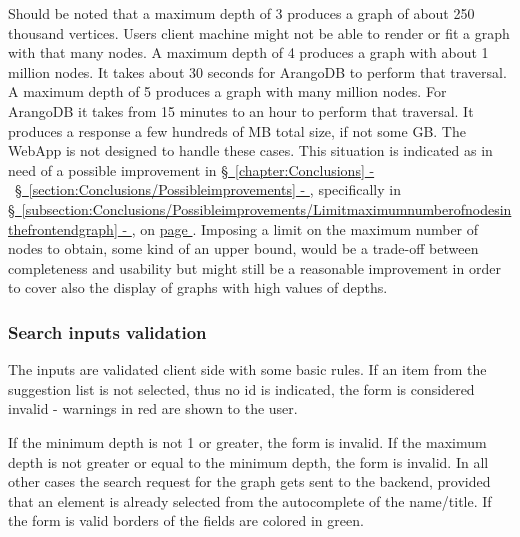 \begin{remark}\label{remark:onbigdepthvalues}
	Should be noted that a maximum depth of 3 produces a graph of about 250 thousand vertices.
    Users client machine might not be able to render or fit a graph with that many nodes.
    A maximum depth of 4 produces a graph with about 1 million nodes. It takes about 30 seconds for ArangoDB to perform that traversal.
    A maximum depth of 5 produces a graph with many million nodes. For ArangoDB it takes from 15 minutes to an hour to perform that traversal.
    It produces a response a few hundreds of MB total size, if not some GB. The WebApp is not designed to handle these cases. This situation is indicated as in need of a possible improvement in \hyperref[chapter:Conclusions]{\textnormal{\S\ \ref{chapter:Conclusions} - }} \  \hyperref[section:Conclusions/Possibleimprovements]{\textnormal{\S\ \ref{section:Conclusions/Possibleimprovements} - }}, specifically in \hyperref[subsection:Conclusions/Possibleimprovements/Limitmaximumnumberofnodesinthefrontendgraph]{\textnormal{\S\ \ref{subsection:Conclusions/Possibleimprovements/Limitmaximumnumberofnodesinthefrontendgraph} - }}, on \hyperref[subsection:Conclusions/Possibleimprovements/Limitmaximumnumberofnodesinthefrontendgraph]{page \pageref{subsection:Conclusions/Possibleimprovements/Limitmaximumnumberofnodesinthefrontendgraph}}.
    Imposing a limit on the maximum number of nodes to obtain, some kind of an upper bound, would be a trade-off between completeness and usability but might still be a reasonable improvement in order to cover also the display of graphs with high values of depths.
\end{remark}

\subsubsection{Search inputs validation}\label{subsection:ImplementingtheWebApp/Thefrontend/SearchFormcomponent/Searchinputsvalidation}
The inputs are validated client side with some basic rules.
If an item from the suggestion list is not selected, thus no id is indicated, the form is considered invalid - warnings in red are shown to the user.

If the minimum depth is not 1 or greater, the form is invalid.
If the maximum depth is not greater or equal to the minimum depth, the form is invalid.
In all other cases the search request for the graph gets sent to the \gls{backend}, provided that an element is already selected from the autocomplete of the name/title.
If the form is valid borders of the fields are colored in green.

